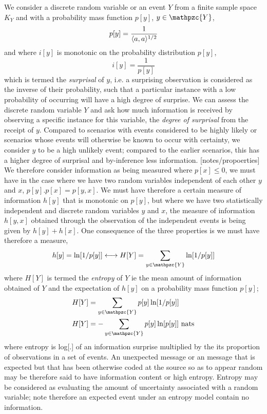 \documentclass[7pt]{article}
\begin{document}
We consider a discrete random variable or an event $Y$ from a finite sample space $K_{Y}$  and with a probability mass function $p[y]$, $y \in \mathpzc{Y}$,
\begin{equation}
p[y] = \dfrac{1}{\inn{a,a}^{1/2}}
\end{equation}
and where $i[y]$  is monotonic on the probability distribution $p[y]$,
\begin{equation}
i[y] = \dfrac{1}{p[y]}
\end{equation}
which is termed the \emph{surprisal} of $y$, i.e. a surprising observation is considered as the inverse of their probability, such that a particular instance with a low probability of occurring will have a high degree of surprise. We can assess the discrete random variable $Y$ and ask how much information is received by observing a specific instance for this variable, the \emph{degree of surprisal} from the receipt of $y$. Compared to scenarios with events considered to be highly likely or scenarios whose events will otherwise be known to occur with certainty, we consider $y$ to be a high unlikely event; compared to the earlier scenarios, this has a higher degree of surprisal and by-inference less information. [notes/propoerties] We therefore consider information as being measured where $p[x] \leq 0$, we must have in the case where we have two random variables independent of each other $y$ and $x$, $p[y].p[x] = p[y,x]$. We must have therefore a certain measure of information $h[y]$ that is monotonic on $p[y]$, but where we have two statistically independent and discrete random variables $y$ and $x$, the measure  of information $h[y,x]$ obtained through the observation of the independent events is being given by $h[y] + h[x]$. One consequence of the three properties is  we must have therefore a measure,
\begin{equation}
h[y] = \ln [ 1 / p[y] ]\longleftrightarrow H[Y] =  \sum_{y \in \mathpzc{Y}} \ln [ 1 / p[y] ]
\end{equation}
where $H[Y]$ is termed the \emph{entropy} of $Y$ ie  the mean amount of information obtained of $Y$ and the expectation of $h[y]$ on a probability mass function $p[y]$;
\begin{equation}
\begin{split}
H[Y] & =  \sum_{y \in \mathpzc{Y}} p[y] \ln [1/p[y]] \\
H[Y] & = - \sum_{y \in \mathpzc{Y}} p[y] \ln [p[y]] \text{ nats}
\end{split}
\end{equation}
where entropy is  log[.] of an information surprise multiplied by the its proportion of observations in a set of events. An unexpected message or an message that is expected but that has been otherwise coded at the source so as to appear random may be therefore said to have information content or  high entropy. Entropy may be considered as evaluating the amount of uncertainty associated with a random variable; note therefore an expected event under an entropy model contain no information.
\end{document}
